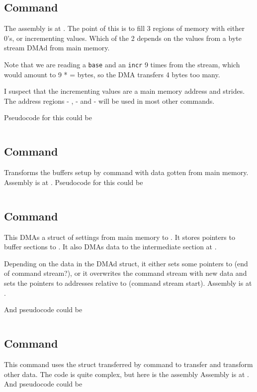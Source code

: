 \subsection{Command }
The assembly is at . The point of this is to fill 3 regions of memory with either 0's, or incrementing values. Which of the 2 depends on the values from a  byte stream DMAd from main memory. 

Note that we are reading a \texttt{base} and an \texttt{incr} 9 times from the stream, which would amount to 9 *  =  bytes, so the DMA transfers 4 bytes too many.

I suspect that the incrementing values are a main memory address and strides. The address regions  - ,  -  and  -  will be used in most other commands.

Pseudocode for this could be 

\inputminted{cpp}{../ucode/command_0.c}

\subsection{Command }
Transforms the buffers setup by command  with data gotten from main memory. Assembly is at .
Pseudocode for this could be 

\inputminted{cpp}{../ucode/command_1.c}

\subsection{Command }
This DMAs a struct of settings from main memory to . It stores pointers to buffer sections to . It also DMAs data to the intermediate section at . 

Depending on the data in the DMAd struct, it either sets some pointers to  (end of command stream?), or it overwrites the command stream with new data and sets the pointers to addresses relative to  (command stream start). Assembly is at .

And pseudocode could be

\inputminted{cpp}{../ucode/command_2.c}

\subsection{Command }
This command uses the struct transferred by command  to transfer and transform other data. The code is quite complex, but here is the assembly Assembly is at .
And pseudocode could be

